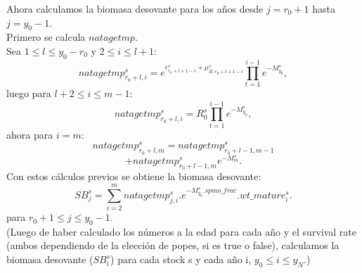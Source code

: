 \documentclass{article}
\begin{document}
Ahora calculamos la biomasa desovante para los años desde $j=r_0+1$ hasta $j=y_0-1$.\\
Primero se calcula $natagetmp$.\\
Sea $1\leq l \leq y_0-r_0$ y $2\leq i \leq l+1$:
\begin{equation}
natagetmp^s_{r_0+l,i}= e^{\epsilon^s_{r_0+l+1-i}+\mu^s_{R,r_0+l+1-i}}\prod_{t=1}^{i-1}e^{-M^s_{y_0}},
\end{equation}
luego para $l+2\leq  i \leq m-1$:
\begin{equation}
natagetmp^s_{r_0+l,i}=R^s_0\prod_{t=1}^{i-1}e^{-M^s_{y_0}},
\end{equation}
ahora para $i=m$:
\begin{equation}
natagetmp^s_{r_0+l,m}=natagetmp^s_{r_0+l-1,m-1}
\end{equation}
\begin{equation*}
    +natagetmp^s_{r_0+l-1,m}e^{-M^s_{m}}.
\end{equation*}
Con estos cálculos previos se obtiene la biomasa desovante:
\begin{equation}
    SB^s_j=\sum_{i=2}^{m}natagetmp^s_{j,i}.e^{-M^s_{y_0}.spmo\_frac}.wt\_mature^s_i.
\end{equation}
para $r_0 +1 \leq j \leq y_0-1$. \\

(Luego de haber calculado los números a la edad para cada año y el survival rate (ambos dependiendo de la elección de popes, si es true o false), calculamos la biomasa desovante ($SB^s_i$) para cada stock s y cada año i, $y_0 \leq i \leq y_N$.)
\end{document}
